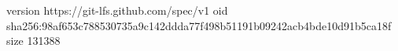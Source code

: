 version https://git-lfs.github.com/spec/v1
oid sha256:98af653c788530735a9c142ddda77f498b51191b09242acb4bde10d91b5ca18f
size 131388
